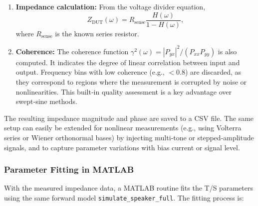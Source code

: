 \begin{enumerate}
  \item \textbf{Impedance calculation:} From the voltage divider equation,
        \[
        Z_{\text{DUT}}(\omega) = R_{\text{sense}} \frac{H(\omega)}{1 - H(\omega)},
        \]
        where $R_{\text{sense}}$ is the known series resistor.
  \item \textbf{Coherence:} The coherence function $\gamma^2(\omega) = |P_{yx}|^2 / (P_{xx} P_{yy})$ is also computed. It indicates the degree of linear correlation between input and output. Frequency bins with low coherence (e.g., $<0.8$) are discarded, as they correspond to regions where the measurement is corrupted by noise or nonlinearities. This built‑in quality assessment is a key advantage over swept‑sine methods.
\end{enumerate}

The resulting impedance magnitude and phase are saved to a CSV file. The same setup can easily be extended for nonlinear measurements (e.g., using Volterra series or Wiener orthonormal bases) by injecting multi‑tone or stepped‑amplitude signals, and to capture parameter variations with bias current or signal level.

\subsubsection{Parameter Fitting in MATLAB}

With the measured impedance data, a MATLAB routine fits the T/S parameters using the same forward model \texttt{simulate\_speaker\_full}. The fitting process is:

